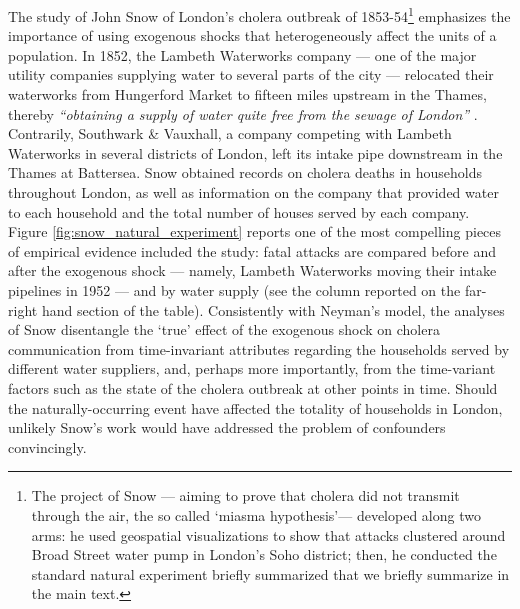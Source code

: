 \documentclass[11pt]{article}
\begin{document}
\begin{refsection}
The study of John Snow of London's cholera outbreak of 1853-54\footnote{The
project of Snow --- aiming to prove that cholera did not transmit through the
air, the so called `miasma hypothesis'--- developed along two arms: he used
geospatial visualizations to show that attacks clustered around Broad Street
water pump in London's Soho district; then, he conducted the standard natural
experiment briefly summarized that we briefly summarize in the main text.}
emphasizes the importance of using exogenous shocks that heterogeneously affect
the units of a population. In 1852, the Lambeth Waterworks company --- one of
the major utility companies supplying water to several parts of the city ---
relocated their waterworks from Hungerford Market to fifteen miles upstream in
the Thames, thereby \textit{``obtaining a supply of water quite free from the
sewage of London''} \autocite[][page 68]{snow_1855}. Contrarily, Southwark \&
Vauxhall, a company competing with Lambeth Waterworks in several districts of
London, left its intake pipe downstream in the Thames at Battersea. Snow
obtained records on cholera deaths in households throughout London, as well as
information on the company that provided water to each household and the total
number of houses served by each company. Figure
\ref{fig:snow_natural_experiment} reports one of the most compelling pieces of
empirical evidence included the study: fatal attacks are compared before and
after the exogenous shock --- namely, Lambeth Waterworks moving their intake pipelines in
1952 --- and by water supply (see the column reported on the far-right hand section
of the table). Consistently with Neyman's model, the analyses of Snow
disentangle the `true' effect of the exogenous shock on cholera communication from
time-invariant attributes regarding the households served by different water
suppliers, and, perhaps more importantly, from the time-variant factors such as
the state of the cholera outbreak at other points in time. Should the
naturally-occurring event have affected the totality of households in London,
unlikely Snow's work would have addressed the problem of confounders
convincingly.  

\begin{figure}
  \begin{small}
    \begin{center}
     

\end{center}
\end{small}
\end{figure}
\end{refsection}
\end{document}
